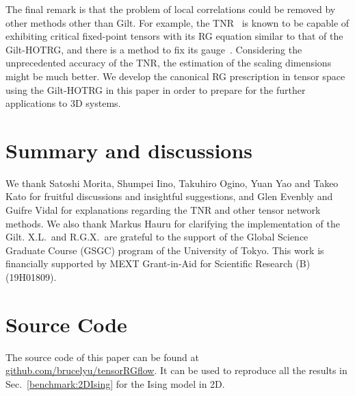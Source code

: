 \documentclass[aps,prb,reprint,superscriptaddress,floatfix]{revtex4-2}
\begin{document}
The final remark is that the problem of local correlations could be removed by other methods other than Gilt.
For example, the TNR~\cite{tnr,tnralgo} is known to be capable of exhibiting critical fixed-point tensors with its RG equation similar to that of the Gilt-HOTRG, and there is a method to fix its gauge~\cite{tnralgo}. 
Considering the unprecedented accuracy of the TNR, the estimation of the scaling dimensions might be much better.
We develop the canonical RG prescription in tensor space using the Gilt-HOTRG in this paper in order to prepare for the further applications to 3D systems.
%


\section{Summary and discussions\label{conclusion}}






\begin{acknowledgments}
We thank Satoshi Morita, Shumpei Iino, Takuhiro Ogino, Yuan Yao and Takeo Kato for fruitful discussions and insightful suggestions, and Glen Evenbly and Guifre Vidal for explanations regarding the TNR and other tensor network methods. 
We also thank Markus Hauru for clarifying the implementation of the Gilt.
X.L.\ and R.G.X.\ are grateful to the support of the Global Science Graduate Course (GSGC) program of the University of Tokyo. 
This work is financially supported by MEXT Grant-in-Aid for Scientific Research (B) (19H01809).

\end{acknowledgments}

\appendix
\section{Source Code}
The source code of this paper can be found at
\href{https://github.com/brucelyu/tensorRGflow}{github.com/brucelyu/tensorRGflow}.
It can be used to reproduce all the results in
Sec.~\ref{benchmark:2DIsing} for the Ising model in 2D.


\end{document}
